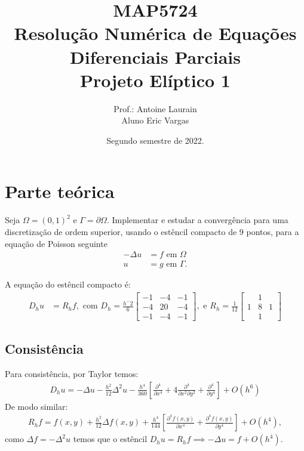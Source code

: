 \documentclass[]{article}
\title{\textbf{MAP5724\\Resolução Numérica de Equações Diferenciais Parciais\\Projeto Elíptico 1}}
\author{Prof.: Antoine Laurain\\Aluno Eric Vargas}
\date{Segundo semestre de 2022.}
\begin{document}
\maketitle
\tableofcontents
\newpage
\section{Parte teórica}
Seja $\Omega = (0,1)^2$ e $\Gamma = \partial \Omega$. Implementar e estudar a convergência para uma discretização de
ordem superior, usando o estêncil compacto de 9 pontos, para a equação de Poisson seguinte
\begin{align}
    -\Delta u &= f \text{ em } \Omega\\
    u &= g \text{ em } \Gamma.
\end{align}

A equação do estêncil compacto é:
\begin{align}
    D_h u &= R_h f,\text{ com }
    D_h =  \frac{h^-2} 6 \left[ 
        \begin{array}{ccc}
            -1& -4& -1\\
            -4& 20& -4\\
            -1& -4& -1
        \end{array}\right], \text { e }
        R_h = \frac 1 {12} \left[ \begin{array}{ccc}            
            &1& \\
            1 &8& 1 \\
            &1&
        \end{array}
        \right]    
\end{align}

\subsection{Consistência}

Para consistência, por Taylor temos:
\begin{align}
    D_h u = -\Delta u  -\frac{h^2} {12} \Delta^2u - \frac{h^4} {360} \left[ 
        \frac {\partial^4}{\partial x^4} 
        +4\frac{\partial^4}{\partial x^2 \partial y^2}
        +\frac{\partial^4}{\partial y^4}
    \right]
    + O(h^6)
\end{align}
De modo similar:
\begin{align*}
    R_h f = f(x,y) + \frac{h^2} {12} \Delta f(x,y) + \frac{h^4} {144} \left[ 
        \frac{ \partial^4f(x,y)}{\partial x^4} +
        \frac{ \partial^4f(x,y)}{\partial y^4}
    \right] + O(h^4),
\end{align*}
como $\Delta f = - \Delta^2 u$ temos que o estêncil $D_h u = R_h f \implies -\Delta u = f + O(h^4)$.
\end{document}
